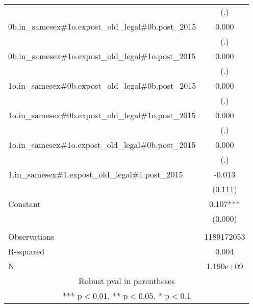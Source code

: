 \documentclass[]{article}
\begin{document}
\begin{tabular}{lc}
 & (.) \\
0b.in\_samesex\#1o.expost\_old\_legal\#0b.post\_2015 & 0.000 \\
 & (.) \\
0b.in\_samesex\#1o.expost\_old\_legal\#1o.post\_2015 & 0.000 \\
 & (.) \\
1o.in\_samesex\#0b.expost\_old\_legal\#0b.post\_2015 & 0.000 \\
 & (.) \\
1o.in\_samesex\#0b.expost\_old\_legal\#1o.post\_2015 & 0.000 \\
 & (.) \\
1o.in\_samesex\#1o.expost\_old\_legal\#0b.post\_2015 & 0.000 \\
 & (.) \\
1.in\_samesex\#1.expost\_old\_legal\#1.post\_2015 & -0.013 \\
 & (0.111) \\
Constant & 0.107*** \\
 & (0.000) \\
 &  \\
Observations & 1189172053 \\
R-squared & 0.004 \\
 N & 1.190e+09 \\ \hline
\multicolumn{2}{c}{ Robust pval in parentheses} \\
\multicolumn{2}{c}{ *** p$<$0.01, ** p$<$0.05, * p$<$0.1} \\
\end{tabular}
\end{document}
